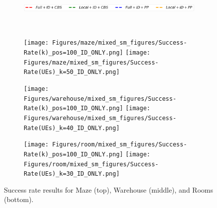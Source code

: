 \documentclass[letterpaper]{article} %
\def\
UrlFont{\rm}  %
\theoremstyle{definition}
\begin{document}
\begin{figure}[tbh]
    \begin{subfigure}[b]{0.9\columnwidth}\centering
      \includegraphics[width=\columnwidth]{Figures/legends_success_rates.png}
    \end{subfigure}\\
        \begin{subfigure}[b]{\columnwidth}\centering
      \texttt{[image: Figures/maze/mixed\_sm\_figures/Success-Rate(k)\_pos=100\_ID\_ONLY.png]}
      \texttt{[image: Figures/maze/mixed\_sm\_figures/Success-Rate(UEs)\_k=50\_ID\_ONLY.png]}
    \end{subfigure}
    \begin{subfigure}[b]{\columnwidth}\centering
      \texttt{[image: Figures/warehouse/mixed\_sm\_figures/Success-Rate(k)\_pos=100\_ID\_ONLY.png]}
      \texttt{[image: Figures/warehouse/mixed\_sm\_figures/Success-Rate(UEs)\_k=40\_ID\_ONLY.png]}
    \end{subfigure}
    \begin{subfigure}[b]{\columnwidth}\centering
      \texttt{[image: Figures/room/mixed\_sm\_figures/Success-Rate(k)\_pos=100\_ID\_ONLY.png]}
      \texttt{[image: Figures/room/mixed\_sm\_figures/Success-Rate(UEs)\_k=30\_ID\_ONLY.png]}
    \end{subfigure}
    \caption{Success rate results for Maze (top), Warehouse (middle), and Rooms (bottom).}
    \label{fig:success-rate}
\end{figure}
\end{document}
